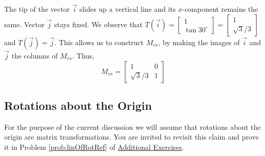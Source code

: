 \documentclass{ximera}
\begin{document}
\begin{example}
\begin{explanation}
\begin{center}
   \quad\quad
{}
\end{center}

The tip of the vector $\vec{i}$ slides up a vertical line and its $x$-component remains the same.  Vector $\vec{j}$ stays fixed.  We observe that $T(\vec{i})=\begin{bmatrix}
1 \\
\tan 30^{\circ}
\end{bmatrix}=\begin{bmatrix}
1 \\
\sqrt{3}/3
\end{bmatrix}$ and $T(\vec{j})=\vec{j}$.  This allows us to construct $M_{vs}$, by making the images of $\vec{i}$ and $\vec{j}$ the columns of $M_{vs}$.  Thus, 
$$M_{vs}=\begin{bmatrix}
1 & 0\\
\sqrt{3}/3 & 1
\end{bmatrix}$$
\end{explanation}
\end{example}



\subsection*{Rotations about the Origin}
For the purpose of the current discussion we will assume that rotations about the origin are matrix transformations.  You are invited to revisit this claim and prove it in Problem \ref{prob:linOfRotRef} of \href{https://ximera.osu.edu/oerlinalg/LinearAlgebra/SUPX-0060/main}{Additional Exercises}.
\end{document}
